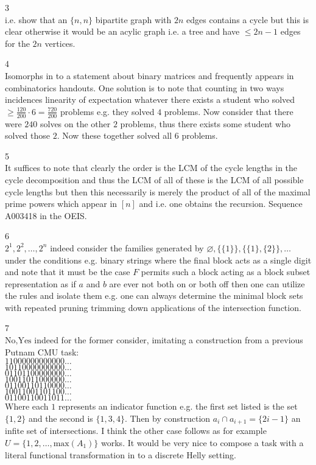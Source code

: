 3 \\
i.e. show that an $\{n,n\}$ bipartite graph with $2n$ edges contains a cycle but this is clear otherwise it would be an acylic graph i.e. a tree and have $\le 2n-1$ edges for the $2n$ vertices.

4 \\
Isomorphs in to a statement about binary matrices and frequently appears in combinatorics handouts. One solution is to note that counting in two ways incidences linearity of expectation whatever there exists a student who solved $\ge \frac{120}{200} \cdot 6=\frac{720}{200}$ problems e.g. they solved $4$ problems. Now consider that there were $240$ solves on the other $2$ problems, thus there exists some student who solved those $2$. Now these together solved all $6$ problems.

5 \\
It suffices to note that clearly the order is the LCM of the cycle lengths in the cycle decomposition and thus the LCM of all of these is the LCM of all possible cycle lengths but then this necessarily is merely the product of all of the maximal prime powers which appear in $[n]$ and i.e. one obtains the recursion. Sequence A003418 in the OEIS.

6 \\
$\boxed{2^1,2^2,\dots,2^n}$ indeed consider the families generated by $\varnothing,\{\{1\}\},\{\{1\},\{2\}\},\dots$ under the conditions e.g. binary strings where the final block acts as a single digit and note that it must be the case $F$ permits such a block acting as a block subset representation as if $a$ and $b$ are ever not both on or both off then one can utilize the rules and isolate them e.g. one can always determine the minimal block sets with repeated pruning trimming down applications of the intersection function.

7 \\
$\boxed{\text{No,Yes}}$ indeed for the former consider, imitating a construction from a previous Putnam CMU task: \\
$11000000000000\dots$ \\
$10110000000000\dots$ \\
$01101100000000\dots$ \\
$10011011000000\dots$ \\
$01100110110000\dots$ \\
$10011001101100\dots$ \\
$01100110011011\dots$ \\
Where each $1$ represents an indicator function e.g. the first set listed is the set  $\{1,2\}$ and the second is $\{1,3,4\}$. Then by construction $a_i \cap a_{i+1}=\{2i-1\}$ an infite set of intersections. I think the other case follows as for example $U=\{1,2,\dots,\text{max}(A_1)\}$ works. It would be very nice to compose a task with a literal functional transformation in to a discrete Helly setting.

